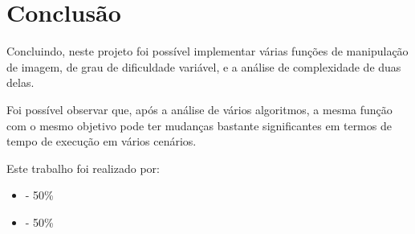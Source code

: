 \section{Conclusão}
    \par Concluindo, neste projeto foi possível implementar várias funções de manipulação de imagem, de grau de dificuldade variável, e a análise de complexidade de duas delas. 
    \par Foi possível observar que, após a análise de vários algoritmos, a mesma função com o mesmo objetivo pode ter mudanças bastante significantes em termos de tempo de execução em vários cenários.

    \par Este trabalho foi realizado por:
        \begin{itemize}
            \item \authorjp - 50\%
            \item \authorrg - 50\% 
        \end{itemize}